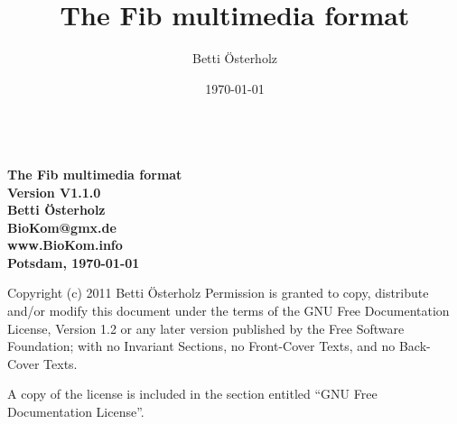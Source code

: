 \documentclass[11pt,a4paper]{article}
\begin{document}
\setlength{\unitlength}{1cm} %

\title{The Fib multimedia format}
\author{Betti \"{O}sterholz}
\date{\today}

\begin{titlepage}
	\begin{center}
	\ \vspace{2.5cm} \\
	\Huge\bf The Fib multimedia format\\\vspace{0.5cm}
	\LARGE Version V1.1.0\\\vspace{2cm}
	\LARGE Betti \"{O}sterholz\\\vspace{0.5cm}
	\large BioKom@gmx.de\\\vspace{0.5cm}
	\large www.BioKom.info\\\vspace{0.5cm}
	Potsdam, \today\\\vspace{5.5cm}
	\end{center}
	
	\noindent
Copyright (c) 2011  Betti \"{O}sterholz
\newline\newline
Permission is granted to copy, distribute and/or modify this document under the terms of the GNU Free Documentation License, Version 1.2 or any later version published by the Free Software Foundation; with no Invariant Sections, no Front-Cover Texts, and no Back-Cover Texts.

A copy of the license is included in the section entitled "`GNU Free Documentation License"'.
\end{titlepage}

\renewcommand{\sectionmark}[1]{\markboth{#1}{}}
\pagestyle{scrheadings} %
\setheadsepline{0.4pt}
\ihead{} %
\ohead{} %
\chead{\slshape \headmark}  %
\cfoot{\thepage} %


\ihead{\slshape \headmark } %
\ohead{}
\chead{}
\clearpage
\end{document}
